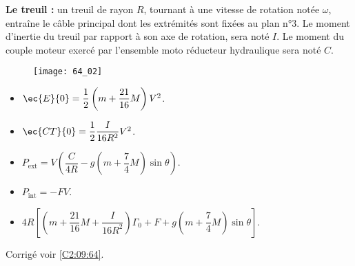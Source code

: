 \textbf{Le treuil :} un treuil de rayon $R$, tournant à une vitesse de rotation notée $\omega$, entraîne le câble principal
dont les extrémités sont fixées au plan n°3. Le moment d’inertie du treuil par rapport à son axe de rotation, sera noté $I$.
Le moment du couple moteur exercé par l’ensemble moto réducteur hydraulique sera noté $C$.

\begin{figure}[H]
\centering
\texttt{[image: 64\_02]}
\end{figure}
\fi


\ifprof
\else
\fi

\ifprof
\else
\fi

\ifprof
\else
\fi

\ifprof
\else
\fi

\ifprof
\else
\fi



\ifprof
\else
\footnotesize
\begin{itemize}
\item $\ec{E}{0}=\dfrac{1}{2}\left(m+\dfrac{21}{16}M \right)V^2$.
\item $\ec{CT}{0}=\dfrac{1}{2}\dfrac{I}{16R^2}V^2$.
\item $P_{\text{ext}}=V\left(\dfrac{C}{4R}-g\left(m+\dfrac{7}{4}M \right)\sin\theta\right)$.
\item $P_{\text{int}}=-FV$.
\item $4R\left[\left(m+\dfrac{21}{16}M+\dfrac{I}{16R^2}\right)\Gamma_0 +F+g\left( m+\dfrac{7}{4}M\right)\sin \theta \right]$.
\end{itemize}
\normalsize
\begin{flushright}
\footnotesize{Corrigé  voir \ref{C2:09:64}.}
\end{flushright}%
\fi